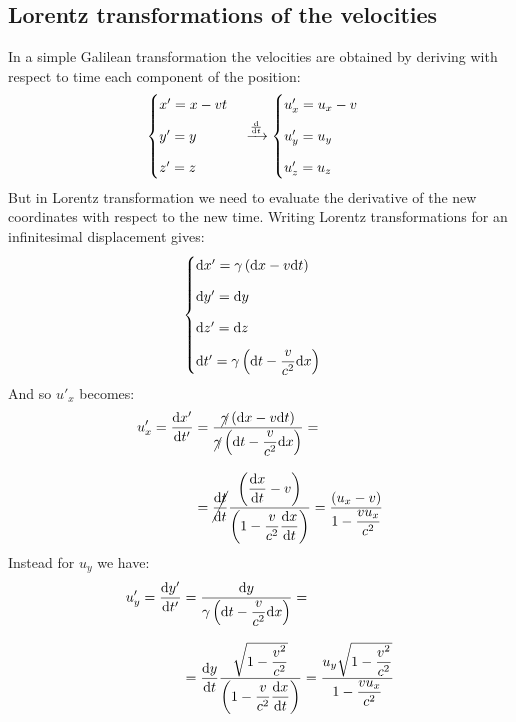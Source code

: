 \subsection{Lorentz transformations of the velocities}
In a simple Galilean transformation the velocities are obtained by deriving with respect to time each component of the position:
\begin{equation}
  \begin{cases}
    x' = x - vt \\[8pt]
    y' = y \\[8pt]
    z' = z
  \end{cases} \xrightarrow{\frac{\mathrm{d}}{\mathrm{d}t}}
  \begin{cases}
    u'_x = u_x - v \\[8pt]
    u'_y = u_y \\[8pt]
    u'_z = u_z
  \end{cases}
\end{equation}
But in Lorentz transformation we need to evaluate the derivative of the new coordinates with respect to the new time. Writing Lorentz transformations for an infinitesimal displacement gives:
\begin{equation}
  \begin{cases}
    \mathrm{d}x' = \gamma \left(\mathrm{d}x - v \mathrm{d}t\right) \\[8pt]
    \mathrm{d}y' = \mathrm{d}y \\[8pt]
    \mathrm{d}z' = \mathrm{d}z \\[8pt]
    \mathrm{d}t' = \gamma \left(\mathrm{d}t - \dfrac{v}{c^2} \mathrm{d}x\right)
  \end{cases}
\end{equation}
And so $u'_x$ becomes:
\begin{equation}
  \begin{split}
    u'_x = \dv{x'}{t'} &= \dfrac{\cancel{\gamma} \brackets{\diff{x} - v \diff{t}}}{\cancel{\gamma} \brackets{\diff{t} - \dfrac{v}{c^2} \diff{x}}} =\\[8pt]
    &= \cancel{\dv{t}{t}}\dfrac{\brackets{\dv{x}{t} - v}}{\brackets{1 - \dfrac{v}{c^2} \dv{x}{t}}} = \dfrac{\brackets{u_x - v}}{1 - \dfrac{v u_x}{c^2} }
  \end{split}
\end{equation}
Instead for $u_y$ we have:
\begin{equation}
  \begin{split}
    u'_y = \dv{y'}{t'} &= \dfrac{\diff{y}}{\gamma \brackets{\diff{t} - \dfrac{v}{c^2} \diff{x}}} =\\[8pt]
  &= \dv{y}{t}\dfrac{\sqrt{1-\dfrac{v^2}{c^2}}}{\brackets{1 - \dfrac{v}{c^2} \dv{x}{t}}} = \dfrac{u_y\sqrt{1-\dfrac{v^2}{c^2}}}{1 - \dfrac{v u_x}{c^2}}
  \end{split}
\end{equation}
